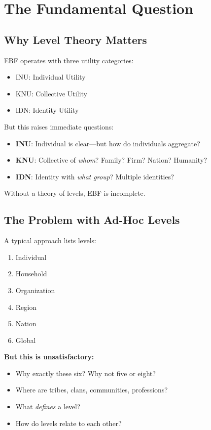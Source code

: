 \section{The Fundamental Question}
\label{sec:aaa-fundamental}

\subsection{Why Level Theory Matters}

EBF operates with three utility categories:
\begin{itemize}
\item INU: Individual Utility
\item KNU: Collective Utility  
\item IDN: Identity Utility
\end{itemize}

But this raises immediate questions:
\begin{itemize}
\item \textbf{INU}: Individual is clear---but how do individuals aggregate?
\item \textbf{KNU}: Collective of \emph{whom}? Family? Firm? Nation? Humanity?
\item \textbf{IDN}: Identity with \emph{what group}? Multiple identities?
\end{itemize}

Without a theory of levels, EBF is incomplete.

\subsection{The Problem with Ad-Hoc Levels}

A typical approach lists levels:
\begin{enumerate}
\item Individual
\item Household
\item Organization
\item Region
\item Nation
\item Global
\end{enumerate}

\textbf{But this is unsatisfactory:}
\begin{itemize}
\item Why exactly these six? Why not five or eight?
\item Where are tribes, clans, communities, professions?
\item What \emph{defines} a level?
\item How do levels relate to each other?
\end{itemize}

